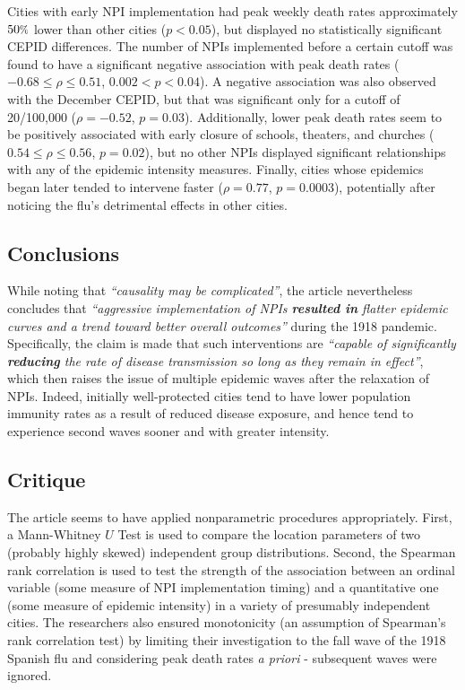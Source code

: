 \documentclass{article}
\newcommand*\pct{\scalebox{.85}{\%}}
\begin{document}
\begin{multicols}{2}
Cities with early NPI implementation had peak weekly death rates approximately $50\pct$ lower than other cities ($p < 0.05$), but displayed no statistically significant CEPID differences. The number of NPIs implemented before a certain cutoff was found to have a significant negative association with peak death rates ($-0.68 \leq \rho \leq 0.51$, $0.002 < p < 0.04$). A negative association was also observed with the December CEPID, but that was significant only for a cutoff of 20/100,000 ($\rho = -0.52$, $p = 0.03$). Additionally, lower peak death rates seem to be positively associated with early closure of schools, theaters, and churches ($0.54 \leq \rho \leq 0.56$, $p = 0.02$), but no other NPIs displayed significant relationships with any of the epidemic intensity measures. Finally, cities whose epidemics began later tended to intervene faster ($\rho = 0.77$, $p = 0.0003$), potentially after noticing the flu's detrimental effects in other cities.

\subsection*{Conclusions}

While noting that \textit{``causality may be complicated''}, the article nevertheless concludes that \textit{``aggressive implementation of NPIs \textbf{resulted in} flatter epidemic curves and a trend toward better overall outcomes''} during the 1918 pandemic. Specifically, the claim is made that such interventions are \textit{``capable of significantly \textbf{reducing} the rate of disease transmission so long as they remain in effect''}, which then raises the issue of multiple epidemic waves after the relaxation of NPIs. Indeed, initially well-protected cities tend to have lower population immunity rates as a result of reduced disease exposure, and hence tend to experience second waves sooner and with greater intensity.

\subsection*{Critique}

The article seems to have applied nonparametric procedures appropriately. First, a Mann-Whitney $U$ Test is used to compare the location parameters of two (probably highly skewed) independent group distributions. Second, the Spearman rank correlation is used to test the strength of the association between an ordinal variable (some measure of NPI implementation timing) and a quantitative one (some measure of epidemic intensity) in a variety of presumably independent cities. The researchers also ensured monotonicity (an assumption of Spearman's rank correlation test) by limiting their investigation to the fall wave of the 1918 Spanish flu and considering peak death rates \textit{a priori} - subsequent waves were ignored.


\end{multicols}
\end{document}
